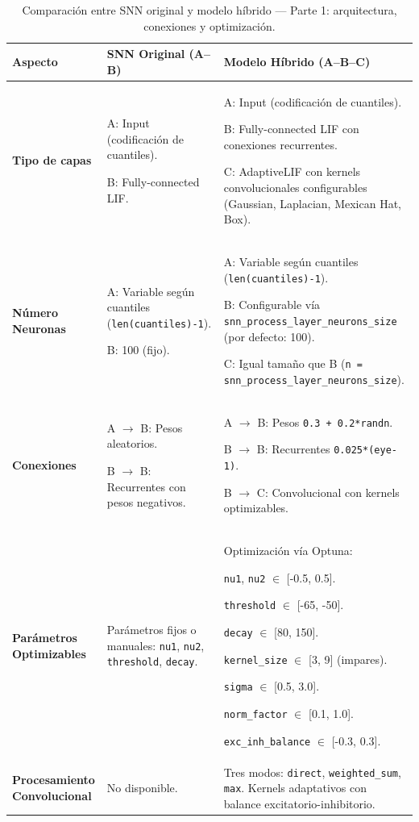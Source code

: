 \begin{table}[!htbp]
\centering
\small
\renewcommand{\arraystretch}{1.3}
\begin{tabularx}{0.99\textwidth}{>{\hsize=0.5\hsize\raggedright\arraybackslash}X
                                 >{\hsize=1.2\hsize\raggedright\arraybackslash}X
                                 >{\hsize=1.3\hsize\raggedright\arraybackslash}X}
\hline\hline
\textbf{Aspecto} & \textbf{SNN Original (A--B)} & \textbf{Modelo Híbrido (A--B--C)} \\
\hline
\textbf{Tipo de capas} & 
A: Input (codificación de cuantiles).  

B: Fully-connected LIF. & 

A: Input (codificación de cuantiles).  

B: Fully-connected LIF con conexiones recurrentes.  

C: AdaptiveLIF con kernels convolucionales configurables (Gaussian, Laplacian, Mexican Hat, Box). \\
\hline
\textbf{Número Neuronas} & 
A: Variable según cuantiles (\texttt{len(cuantiles)-1}).

B: 100 (fijo). & 

A: Variable según cuantiles (\texttt{len(cuantiles)-1}).  

B: Configurable vía \texttt{snn\_process\_layer\_neurons\_size} (por defecto: 100).  

C: Igual tamaño que B (\texttt{n = snn\_process\_layer\_neurons\_size}). \\
\hline
\textbf{Conexiones} & 
A $\rightarrow$ B: Pesos aleatorios.  

B $\rightarrow$ B: Recurrentes con pesos negativos. & 

A $\rightarrow$ B: Pesos \texttt{0.3 + 0.2*randn}.

B $\rightarrow$ B: Recurrentes \texttt{0.025*(eye-1)}.

B $\rightarrow$ C: Convolucional con kernels optimizables. \\
\hline
\textbf{Parámetros Optimizables} & 
Parámetros fijos o manuales:  
\texttt{nu1}, \texttt{nu2}, \texttt{threshold}, \texttt{decay}. & 
Optimización vía Optuna:  

\texttt{nu1}, \texttt{nu2} $\in$ [-0.5, 0.5].

\texttt{threshold} $\in$ [-65, -50].  

\texttt{decay} $\in$ [80, 150].  

\texttt{kernel\_size} $\in$ [3, 9] (impares).  

\texttt{sigma} $\in$ [0.5, 3.0].  

\texttt{norm\_factor} $\in$ [0.1, 1.0].  

\texttt{exc\_inh\_balance} $\in$ [-0.3, 0.3]. \\
\hline
\textbf{Procesamiento Convolucional} & 
No disponible. & 
Tres modos: \texttt{direct}, \texttt{weighted\_sum}, \texttt{max}.  
Kernels adaptativos con balance excitatorio-inhibitorio. \\
\hline\hline
\end{tabularx}
\caption{Comparación entre SNN original y modelo híbrido — Parte 1: arquitectura, conexiones y optimización.}
\label{tab:comparacion-arquitecturas-1}
\end{table}

